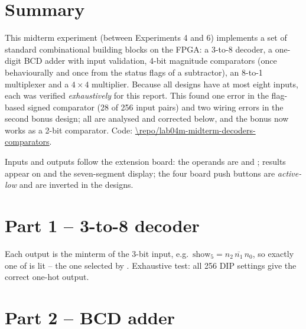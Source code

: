 
\newcommand{\ReportShortTitle}{Midterm experiment -- Decoders, BCD addition, comparators and multiplexers}


\section*{Summary}
This midterm experiment (between Experiments 4 and 6) implements a set of standard combinational building blocks on the FPGA: a 3-to-8
decoder, a one-digit BCD adder with input validation, 4-bit magnitude comparators (once behaviourally and
once from the status flags of a subtractor), an 8-to-1 multiplexer and a $4\times4$ multiplier. Because all
designs have at most eight inputs, each was verified \emph{exhaustively} for this report. This found one
error in the flag-based signed comparator (28 of 256 input pairs) and two wiring errors in the second
bonus design; all are analysed and corrected below, and the bonus now works as a 2-bit comparator.
Code: \url{\repo/lab04m-midterm-decoders-comparators}.

Inputs and outputs follow the extension board: the operands are  and
; results appear on  and the seven-segment display; the four board push
buttons are \emph{active-low} and are inverted in the designs.

\section{Part 1 -- 3-to-8 decoder}
Each output is the minterm of the 3-bit input, e.g.\ $\text{show}_5 = n_2\,\overline{n_1}\,n_0$, so exactly
one of  is lit -- the one selected by . Exhaustive test: all 256 DIP settings
give the correct one-hot output.

\section{Part 2 -- BCD adder}
